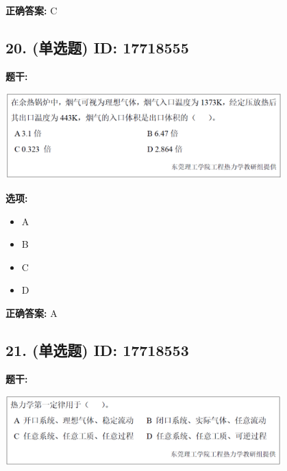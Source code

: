 \documentclass[12pt]{article}
\begin{document}
\textbf{正确答案:}
C

\vspace{0.5em}\hrulefill\vspace{1em}

\subsection*{20. (单选题) \small ID: 17718555}

\textbf{题干:}


\begin{center}\includegraphics[width=0.8\textwidth, height=0.25\textheight, keepaspectratio]{question_20_17718555/title_img_1.png}\end{center}

\textbf{选项:}
\begin{itemize}[leftmargin=*]
  \item A

  \item B

  \item C

  \item D

\end{itemize}

\textbf{正确答案:}
A

\vspace{0.5em}\hrulefill\vspace{1em}

\subsection*{21. (单选题) \small ID: 17718553}

\textbf{题干:}


\begin{center}\includegraphics[width=0.8\textwidth, height=0.25\textheight, keepaspectratio]{question_21_17718553/title_img_1.png}\end{center}
\end{document}
